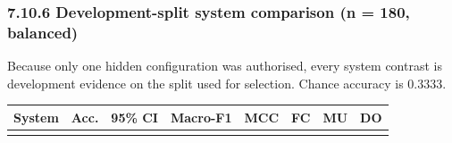 \subsubsection{7.10.6 Development-split system comparison (n = 180,
balanced)}\label{development-split-system-comparison-n-180-balanced}

Because only one hidden configuration was authorised, every system
contrast is development evidence on the split used for selection. Chance
accuracy is 0.3333.

{\def\LTcaptype{none} %
\begin{longtable}[]{@{}
  >{\raggedright\arraybackslash}p{}
  >{\centering\arraybackslash}p{}
  >{\centering\arraybackslash}p{}
  >{\centering\arraybackslash}p{}
  >{\centering\arraybackslash}p{}
  >{\centering\arraybackslash}p{}
  >{\centering\arraybackslash}p{}
  >{\centering\arraybackslash}p{}@{}}
\toprule\noalign{}
\begin{minipage}[b]{\linewidth}\raggedright
\textbf{System}
\end{minipage} & \begin{minipage}[b]{\linewidth}\centering
\textbf{Acc.}
\end{minipage} & \begin{minipage}[b]{\linewidth}\centering
\textbf{95\% CI}
\end{minipage} & \begin{minipage}[b]{\linewidth}\centering
\textbf{Macro-F1}
\end{minipage} & \begin{minipage}[b]{\linewidth}\centering
\textbf{MCC}
\end{minipage} & \begin{minipage}[b]{\linewidth}\centering
\textbf{FC}
\end{minipage} & \begin{minipage}[b]{\linewidth}\centering
\textbf{MU}
\end{minipage} & \begin{minipage}[b]{\linewidth}\centering
\textbf{DO}
\end{minipage} \\
\midrule\noalign{}
\endhead
\bottomrule\noalign{}

\end{longtable}}

